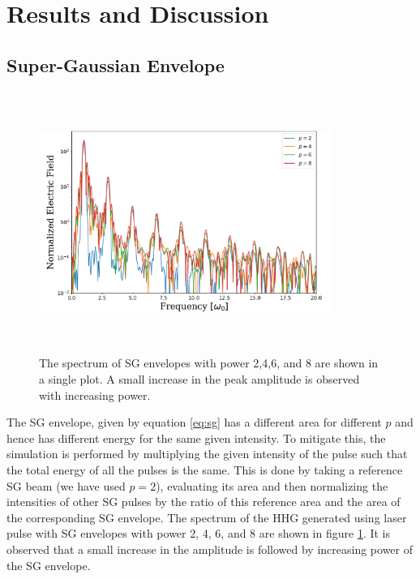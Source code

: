 \documentclass[12pt]{article}
\begin{document}
\section{Results and Discussion}
\subsection{Super-Gaussian Envelope}
\begin{figure}[h]
    \centering
    \includegraphics[width=0.85\textwidth, height=8.5cm]{images/sg_2.png}
    \caption{The spectrum of SG envelopes with power 2,4,6, and 8 are shown in a single plot. A small increase in the peak amplitude is observed with increasing power.}
    \label{fig:sg}
\end{figure}

The SG envelope, given by equation \ref{eq:sg} has a different area for different $p$ and hence has different energy for the same given intensity. To mitigate this, the simulation is performed by multiplying the given intensity of the pulse such that the total energy of all the pulses is the same. This is done by taking a reference SG beam (we have used $p=2$), evaluating its area and then normalizing the intensities of other SG pulses by the ratio of this reference area and the area of the corresponding SG envelope. The spectrum of the HHG generated using laser pulse with SG envelopes with power 2, 4, 6, and 8 are shown in figure \ref{fig:sg}. It is observed that a small increase in the amplitude is followed by increasing power of the SG envelope.
\end{document}
